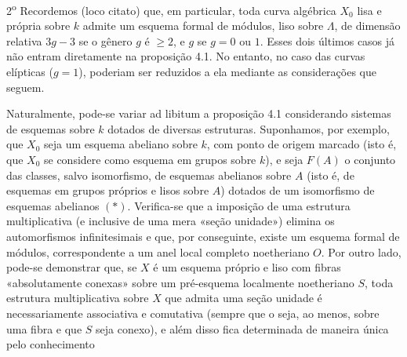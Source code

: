 2\textsuperscript{o} Recordemos (loco citato) que, em particular, toda curva
algébrica $X_0$ lisa e própria sobre $k$ admite um esquema formal de módulos,
liso sobre $\Lambda$, de dimensão relativa $3g-3$ se o gênero $g$ é
$\geq2$, e $g$ se $g=0$ ou $1$. Esses dois últimos casos já não entram diretamente
na proposição 4.1. No entanto, no caso das curvas elípticas
($g=1$), poderiam ser reduzidos a ela mediante as considerações que seguem.

Naturalmente, pode-se variar ad libitum a proposição 4.1 considerando
sistemas de esquemas sobre $k$ dotados de diversas estruturas. Suponhamos,
por exemplo, que $X_0$ seja um esquema abeliano sobre $k$, com ponto de origem
marcado (isto é, que $X_0$ se considere como esquema em grupos sobre $k$), e
seja $F(A)$ o conjunto das classes, salvo isomorfismo, de esquemas abelianos
sobre $A$ (isto é, de esquemas em grupos próprios e lisos sobre $A$) dotados
de um isomorfismo de esquemas abelianos $(*)$. Verifica-se que a imposição
de uma estrutura multiplicativa (e inclusive de uma mera «seção unidade»)
elimina os automorfismos infinitesimais e que, por conseguinte, existe um
esquema formal de módulos, correspondente a um anel local completo
noetheriano $O$. Por outro lado, pode-se demonstrar que, se $X$ é um esquema
próprio e liso com fibras «absolutamente conexas» sobre um pré-esquema localmente
noetheriano $S$, toda estrutura multiplicativa sobre $X$ que admita uma
seção unidade é necessariamente associativa e comutativa (sempre que o seja,
ao menos, sobre uma fibra e que $S$ seja conexo), e além disso fica determinada de
maneira única pelo conhecimento

